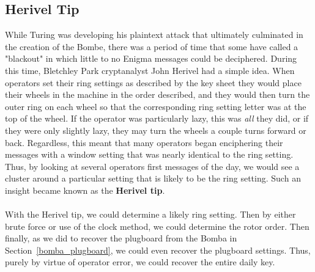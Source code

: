 \subsection{Herivel Tip}
While Turing was developing his plaintext attack that ultimately
culminated in the creation of the Bombe, there was a period of time
that some have called a "blackout" in which little to no Enigma
messages could be deciphered. During this time, Bletchley Park
cryptanalyst John Herivel had a simple idea. When operators set their
ring settings as described by the key sheet they would place their
wheels in the machine in the order described, and they would then
turn the outer ring on each wheel so that the corresponding ring
setting letter was at the top of the wheel. If the operator was
particularly lazy, this was \emph{all} they did, or if they were only
slightly lazy, they may turn the wheels a couple turns forward or
back. Regardless, this meant that many operators began enciphering
their messages with a window setting that was nearly identical to the
ring setting. Thus, by looking at several operators first messages of
the day, we would see a cluster around a particular setting
that is likely to be the ring setting. Such an insight became known
as the {\bf{Herivel tip}}.
\\\\With the Herivel tip, we could determine a likely ring setting.
Then by either brute force or use of the clock method, we could
determine the rotor order. Then finally, as we did to recover the
plugboard from the Bomba in Section~\ref{bomba_plugboard}, we could
even recover the plugboard settings. Thus, purely by virtue of
operator error, we could recover the entire daily key.

